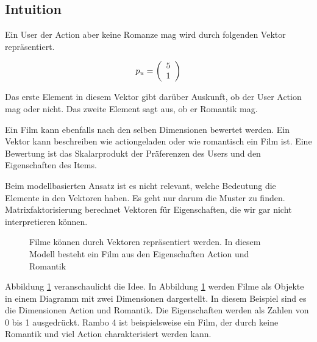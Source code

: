 \documentclass[a4paper, 12pt]{article}
\begin{document}
\subsection{Intuition}
\label{sec:intuition}

Ein User der Action aber keine Romanze mag wird durch folgenden Vektor repräsentiert.

\begin{equation}
  \label{eq:vektor}
  p_u = \left(
  \begin{array}[c]{c}
    5 \\
    1 
  \end{array}
\right)
\end{equation}

Das erste Element in diesem Vektor gibt darüber Auskunft, ob der User Action mag oder nicht. Das zweite Element sagt aus, ob er Romantik mag.

 Ein Film kann ebenfalls nach den selben Dimensionen bewertet werden. Ein Vektor kann beschreiben wie actiongeladen oder wie romantisch ein Film ist. Eine Bewertung ist das Skalarprodukt der Präferenzen des Users und den Eigenschaften des Items. 

Beim modellbasierten Ansatz ist es nicht relevant, welche Bedeutung die Elemente in den Vektoren haben. Es geht nur darum die Muster zu finden. Matrixfaktorisierung berechnet Vektoren für Eigenschaften, die wir gar nicht interpretieren können.

\begin{figure}
\centering
{}
\caption{Filme können durch Vektoren repräsentiert werden. In diesem Modell besteht ein Film aus den Eigenschaften Action und Romantik}
\label{fig:moviedimension}
\end{figure}

Abbildung \ref{fig:moviedimension} veranschaulicht die Idee. In Abbildung \ref{fig:moviedimension} werden Filme als Objekte in einem Diagramm mit zwei Dimensionen dargestellt. In diesem Beispiel sind es die Dimensionen Action und Romantik. Die Eigenschaften werden als Zahlen von 0 bis 1 ausgedrückt. Rambo 4 ist beispielsweise ein Film, der durch keine Romantik und viel Action charakterisiert werden kann.
\end{document}
